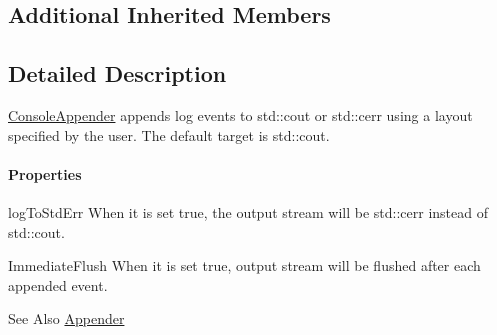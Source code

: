 \subsection*{Additional Inherited Members}


\subsection{Detailed Description}
\hyperlink{classlog4cplus_1_1ConsoleAppender}{Console\-Appender} appends log events to {\ttfamily std\-::cout} or {\ttfamily std\-::cerr} using a layout specified by the user. The default target is {\ttfamily std\-::cout}.

\paragraph*{Properties}


\begin{DoxyDescription}
\item[{\ttfamily log\-To\-Std\-Err} ]When it is set true, the output stream will be {\ttfamily std\-::cerr} instead of {\ttfamily std\-::cout}.


\item[{\ttfamily Immediate\-Flush} ]When it is set true, output stream will be flushed after each appended event.


\end{DoxyDescription}\begin{DoxySeeAlso}{See Also}
\hyperlink{classlog4cplus_1_1Appender}{Appender} 
\end{DoxySeeAlso}


